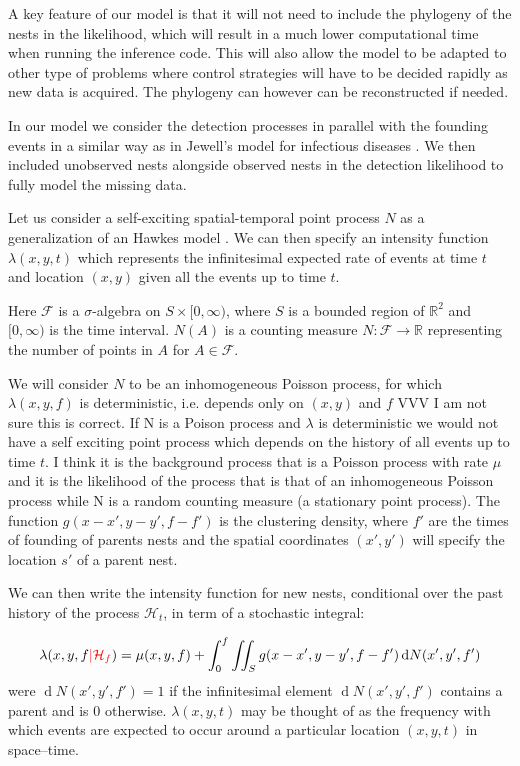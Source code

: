 \documentclass[11pt,a4paper]{article}
\renewcommand{\d}[1]{\ensuremath{\operatorname{d}\!{#1}}}
\begin{document}
A key feature of our model is that it will not need to include the phylogeny of the nests in the likelihood, which will result in a much lower computational time when running the inference code. This will also allow the model to be adapted to other type of problems where control strategies will have to be decided rapidly as new data is acquired. {\color{red}The phylogeny can however can be reconstructed if needed}.

In our model we consider the detection processes in parallel with the founding events in a similar way as in Jewell's model for infectious diseases \cite{Jewell}. We then included unobserved nests alongside observed nests in the detection likelihood to fully model the missing data.

Let us consider a self-exciting spatial-temporal point process $N$ as a generalization of an Hawkes model {\color{red} \cite{Hawkes71}}. We can then specify an intensity function $\lambda(x, y, t)$ which represents the infinitesimal expected  rate of events at time $t$ and location $(x, y)$  given all the events up to time $t$.

Here $\mathcal{F}$ is a $\sigma$-algebra on $S \times [0, \infty )$, where $S$ is a bounded region of $\mathbb{R}^2$ and $[0, \infty)$ is the time interval. $N(A)$ is a counting measure $N: \mathcal{F} \to \mathbb{R}$ representing the number of points in $A$ for $A \in \mathcal{F}$.

We will consider $N$ to be an inhomogeneous Poisson process, for which $\lambda(x, y, f)$ is deterministic, i.e. depends only on $(x, y)$ and $f$ \cite{Shoenberg} {\color{red}VVV I am not sure this is correct. If N is a Poison process and $\lambda$ is deterministic we would not have a self exciting point process which depends on the history of all events up to time $t$. I think it is the background process that is a Poisson process with rate $\mu$ and it is the likelihood of the process that is that of an inhomogeneous Poisson process while N is a random counting measure (a stationary point process)}. The function $g(x - x', y - y', f - f')$ is the clustering density, where $f'$ are the times of founding of parents nests and the spatial coordinates $(x', y')$ will specify the location $s'$ of a parent nest.

We can then write the intensity function for new nests, {\color{red} conditional over the past history of the process $\mathcal{H}_t$}, in term of a stochastic integral:

\begin{equation}\label{eq:intensity}
    \lambda(x, y, f {\color{red}| \mathcal{H}_f}) = \mu(x, y, f) + \int_{0}^{f} \iint_{S} g(x - x', y - y', f - f') \d N(x', y', f')
\end{equation}
were $\d N(x', y', f') = 1$ if the infinitesimal element $\d N(x', y', f')$ contains a parent and is 0 otherwise. $\lambda(x, y, t)$ may be thought of as the frequency with which events are expected to occur around a particular location $(x, y, t)$ in space–time.
\end{document}
